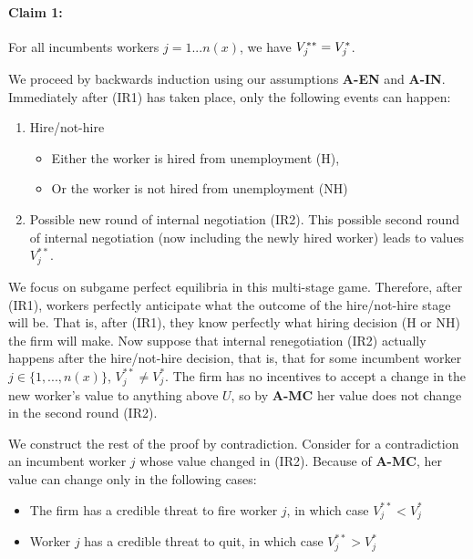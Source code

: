 \paragraph{Claim 1:}

For all incumbents workers $j=1...n(x)$, we have $V_{j}^{\ast\ast}=V_{j}^{%
\ast}$.\newline

We proceed by backwards induction using our assumptions \textbf{A-EN} and \textbf{A-IN}. Immediately after (IR1) has taken place, only the following events can
happen:

\begin{enumerate}
\item Hire/not-hire

\begin{itemize}
\item Either the worker is hired from unemployment (H),

\item Or the worker is not hired from unemployment (NH)
\end{itemize}

\item Possible new round of internal negotiation (IR2). This possible second
round of internal negotiation (now including the newly hired worker) leads
to values $V_j^{**}$.
\end{enumerate}

We focus on subgame perfect equilibria in this multi-stage game. Therefore,
after (IR1), workers perfectly anticipate what the outcome of the
hire/not-hire stage will be. That is, after (IR1), they know perfectly what
hiring decision (H or NH) the firm will make. Now suppose that internal
renegotiation (IR2) actually happens after the hire/not-hire decision, that
is, that for some incumbent worker $j \in \{1,...,n(x)\}$, $V_j^{**} \neq
V_j^*$. The firm has no incentives to accept a change in the new
worker's value to anything above $U$, so by \textbf{A-MC} her value does not
change in the second round (IR2).

We construct the rest of the proof by contradiction. Consider for a
contradiction an incumbent worker $j$ whose value changed in (IR2). Because
of \textbf{A-MC}, her value can change only in the following cases:

\begin{itemize}
\item The firm has a credible threat to fire worker $j$, in which case $%
V_j^{**} < V_j^*$

\item Worker $j$ has a credible threat to quit, in which case $V_j^{**} >
V_j^*$
\end{itemize}

